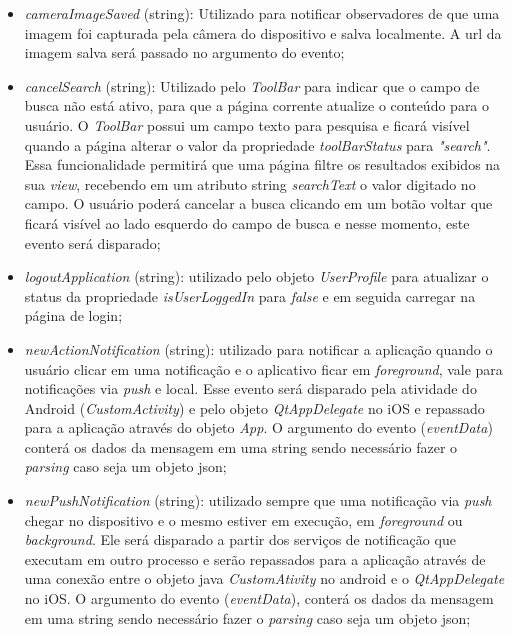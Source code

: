 \begin{itemize}
	\begin{itemize}
		\item \textit{cameraImageSaved} (string): Utilizado para notificar observadores de que uma imagem foi capturada pela câmera do dispositivo e salva localmente. A url da imagem salva será passado no argumento do evento;

		\item \textit{cancelSearch} (string): Utilizado pelo \textit{ToolBar} para indicar que o campo de busca não está ativo, para que a página corrente atualize o conteúdo para o usuário. O \textit{ToolBar} possui um campo texto para pesquisa e ficará visível quando a página alterar o valor da propriedade \textit{toolBarStatus} para \textit{"search"}. Essa funcionalidade permitirá que uma página filtre os resultados exibidos na sua \textit{view}, recebendo em um atributo string \textit{searchText} o valor digitado no campo. O usuário poderá cancelar a busca clicando em um botão voltar que ficará visível ao lado esquerdo do campo de busca e nesse momento, este evento será disparado;

		\item \textit{logoutApplication} (string): utilizado pelo objeto \textit{UserProfile} para atualizar o status da propriedade \textit{isUserLoggedIn} para \textit{false} e em seguida carregar na página de login;

		\item \textit{newActionNotification} (string): utilizado para notificar a aplicação quando o usuário clicar em uma notificação e o aplicativo ficar em \textit{foreground}, vale para notificações via \textit{push} e local. Esse evento será disparado pela atividade do Android (\textit{CustomActivity}) e pelo objeto \textit{QtAppDelegate} no iOS e repassado para a aplicação através do objeto \textit{App}. O argumento do evento (\textit{eventData}) conterá os dados da mensagem em uma string sendo necessário fazer o \textit{parsing} caso seja um objeto json;

		\item \textit{newPushNotification} (string): utilizado sempre que uma notificação via \textit{push} chegar no dispositivo e o mesmo estiver em execução, em \textit{foreground} ou \textit{background}. Ele será disparado a partir dos serviços de notificação que executam em outro processo e serão repassados para a aplicação através de uma conexão entre o objeto java \textit{CustomAtivity} no android e o \textit{QtAppDelegate} no iOS. O argumento do evento (\textit{eventData}), conterá os dados da mensagem em uma string sendo necessário fazer o \textit{parsing} caso seja um objeto json;


\end{itemize}
\end{itemize}
